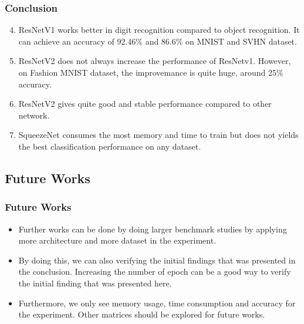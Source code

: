 \documentclass{beamer}
\begin{document}
\begin{frame}\frametitle{Conclusion}
\begin{enumerate}
	\setcounter{enumi}{3}
	\item ResNetV1 works better in digit recognition compared to object recognition. It can achieve an accuracy of 92.46\% and 86.6\% on MNIST and SVHN dataset.
	\item ResNetV2 does not always increase the performance of ResNetv1. However, on Fashion MNIST dataset, the improvemance is quite huge, around 25\% accuracy.
	\item ResNetV2 gives quite good and stable performance compared to other network.
	\item SqueezeNet consumes the most memory and time to train but does not yields the best classification performance on any dataset.
\end{enumerate}
\end{frame}
\subsection{Future Works}
\begin{frame}\frametitle{Future Works}
\begin{itemize}
	 \item Further works can be done by doing larger benchmark studies by applying more architecture and more dataset in the experiment. 
	 \item By doing this, we can also verifying the initial findings that was presented in the conclusion. Increasing the number of epoch can be a good way to verify the initial finding that was presented here. 
	 \item Furthermore, we only see memory usage, time consumption and accuracy for the experiment. Other matrices should be explored for future works.
\end{itemize}
\end{frame}
\end{document}
